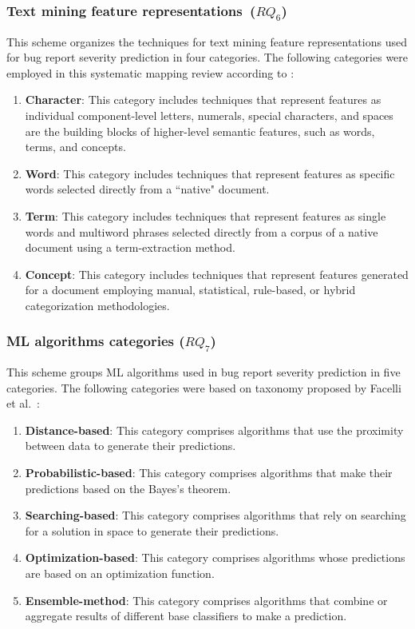 \subsubsection{Text mining feature representations~($RQ_6$)}
This scheme organizes the techniques for text mining feature representations used for bug report severity prediction in four categories. The following categories were employed in this systematic mapping review according to \cite{Feldman:2006}:

\begin{enumerate}[label=\alph*., leftmargin=1.2cm]
  \item \textbf{Character}: This category includes techniques that represent features as individual component-level letters, numerals, special characters, and spaces are the building blocks of higher-level semantic features, such as words, terms, and concepts.
  \item \textbf{Word}: This category includes techniques that represent features as specific words selected directly from a ``native" document.
  \item \textbf{Term}: This category includes techniques that represent features as single words and multiword phrases selected directly from a corpus of a native document using a term-extraction method. 
  \item \textbf{Concept}: This category includes techniques that represent features generated for a document employing manual, statistical, rule-based, or hybrid categorization methodologies.
\end{enumerate}

\subsubsection{ML algorithms categories ($RQ_7$)}
This scheme groups ML algorithms used in bug report severity prediction in five categories. The following categories were based on taxonomy proposed by Facelli et al.~\cite{Facelli:2015}:

\begin{enumerate}[label=\alph*., leftmargin=1.2cm]
  \item \textbf{Distance-based}: This category comprises algorithms that use the proximity between data to generate their predictions.
  \item \textbf{Probabilistic-based}: This category comprises algorithms that make their predictions based on the Bayes's theorem.
  \item \textbf{Searching-based}: This category comprises algorithms that rely on searching for a solution in space to generate their predictions.
  \item \textbf{Optimization-based}: This category comprises algorithms whose predictions are based on an optimization function.
  \item \textbf{Ensemble-method}: This category comprises algorithms that combine or aggregate results of different base classifiers to make a prediction.
\end{enumerate}

